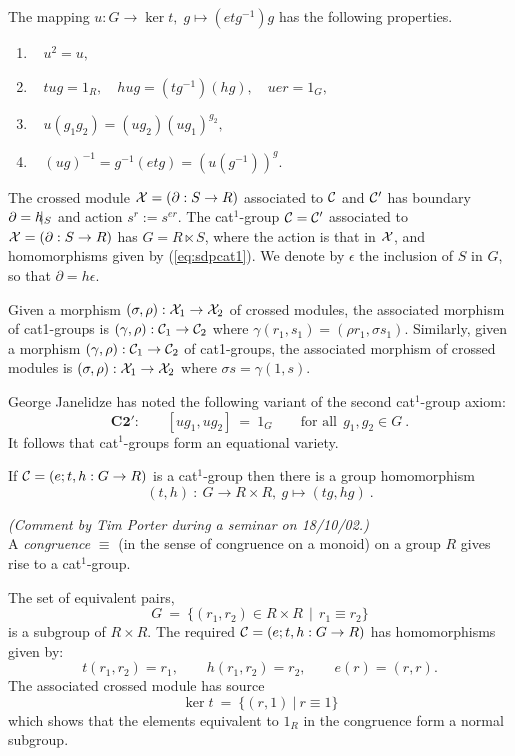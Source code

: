 \begin{lem} \label{lem:u-props}
The mapping $u : G \to \ker t,\; g \mapsto (etg^{-1})g$ has the
following properties.
\begin{enumerate}[{\rm (i)}]
\item~ $u^2 = u,$
\item~ $tug = 1_R,\quad hug = (tg^{-1})(hg),\quad uer = 1_G, $
\item~ $u(g_1g_2) = (ug_2)(ug_1)^{g_2},$
\item~ $(ug)^{-1} = g^{-1}(etg) = (u(g^{-1}))^g.$
\end{enumerate}
\end{lem}
The crossed module $\mathcal{X} = (\partial : S \to R)$  
associated to  $\mathcal{C}$  and  $\mathcal{C}'$  has boundary 
$\partial = h\hspace{-5pt}\mid_S$ and action $s^r := s^{er}$. 
The cat$^1$-group  $\mathcal{C} = \mathcal{C}'$  associated to  
$\mathcal{X} = (\partial : S \to R)$  has  $G = R \ltimes S$, 
where the action is that in  $\mathcal{X}$,
and homomorphisms given by (\ref{eq:sdpcat1}).
We denote by  $\epsilon$  the inclusion of  $S$  in  $G$,
so that  $\partial = h \epsilon$.

Given a morphism 
$(\sigma,\rho) : \mathcal{X}_1 \to \mathcal{X}_2$ of crossed modules,
the associated morphism of cat1-groups is
$(\gamma,\rho) : \mathcal{C}_1 \to \mathcal{C}_2$ where
$\gamma(r_1,s_1) = (\rho r_1, \sigma s_1)$.
Similarly, given a morphism 
$(\gamma,\rho) : \mathcal{C}_1 \to \mathcal{C}_2$ of cat1-groups,
the associated morphism of crossed modules is
$(\sigma,\rho) : \mathcal{X}_1 \to \mathcal{X}_2$ where
$\sigma s = \gamma(1,s)$.


George Janelidze has noted the following variant of the second
cat$^1$-group axiom:
$$
\textbf{C2}'\textbf{:}  \qquad  
[ug_1,ug_2] ~=~ 1_G
\qquad \text{for all}~~ g_1,g_2 \in G~.
$$
It follows that cat$^1$-groups form an equational variety.

\begin{lem}
If  $\mathcal{C} = (e;t,h : G \to R )$  is a cat$^1$-group
then there is a group homomorphism
$$
(t,h) ~:~ G \to R \times R, ~ g \mapsto (tg,hg)~.
$$
\end{lem}


\begin{prop}
\emph{(Comment by Tim Porter during a seminar on 18/10/02.)\\}
A \emph{congruence}  $\equiv$ 
(in the sense of congruence on a monoid) 
on a group $R$ gives rise to a cat$^1$-group.
\end{prop}
\begin{pf}
The set of equivalent pairs,
$$
G ~=~ \{(r_1,r_2) \in R \times R ~~|~~ r_1 \equiv r_2 \}
$$
is a subgroup of  $R \times R$.
The required  $\mathcal{C} = (e;t,h : G \to R )$  has homomorphisms given by:
$$
t(r_1,r_2) = r_1, \qquad
h(r_1,r_2) = r_2, \qquad
e(r) = (r,r).
$$
The associated crossed module has source
$$
\ker t ~=~ \{(r,1) ~|~ r \equiv 1 \}
$$
which shows that the elements equivalent to $1_R$ in the congruence
form a normal subgroup.
\end{pf}



